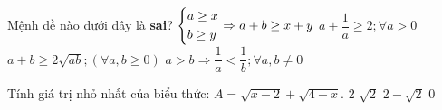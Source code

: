 \begin{ex}%
Mệnh đề nào dưới đây là \textbf{sai}?
\choice
{$\left\{\begin{aligned}
& a\ge x \\ 
& b\ge y \\\end{aligned}\right.\Rightarrow a+b\ge x+y$}
{$a+\dfrac{1}{a}\ge 2; \forall a>0$}
{$a+b\ge 2\sqrt{ab} ; \left(\forall a, b\ge 0\right)$}
{\True $a>b\Rightarrow \dfrac{1}{a}<\dfrac{1}{b}; \forall a, b\ne 0$}
\end{ex}
\begin{ex}%
Tính giá trị nhỏ nhất của biểu thức: $A=\sqrt{x-2}+\sqrt{4-x}$.
\choice
{$2$}
{\True $\sqrt{2}$}
{$2-\sqrt{2}$}
{$0$}
\end{ex}


